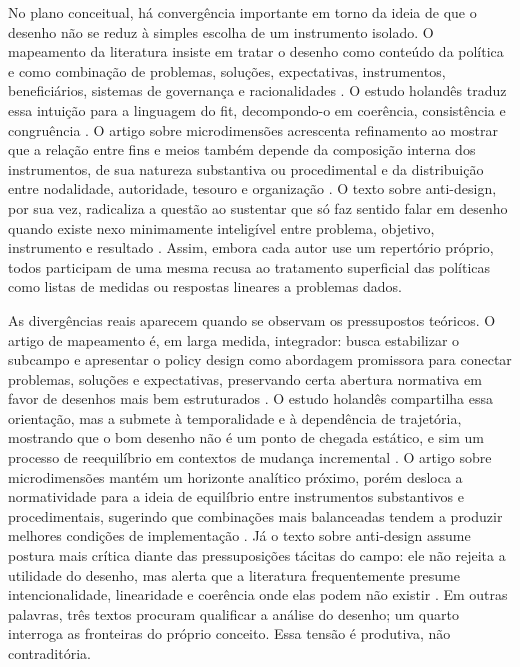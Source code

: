 \documentclass[12pt,a4paper]{article}
\begin{document}
No plano conceitual, há convergência importante em torno da ideia de que o desenho não se reduz à simples escolha de um instrumento isolado. O mapeamento da literatura insiste em tratar o desenho como conteúdo da política e como combinação de problemas, soluções, expectativas, instrumentos, beneficiários, sistemas de governança e racionalidades \parencite{lima2021_conectando_problemas}. O estudo holandês traduz essa intuição para a linguagem do fit, decompondo-o em coerência, consistência e congruência \parencite{geet2019_policy_design}. O artigo sobre microdimensões acrescenta refinamento ao mostrar que a relação entre fins e meios também depende da composição interna dos instrumentos, de sua natureza substantiva ou procedimental e da distribuição entre nodalidade, autoridade, tesouro e organização \parencite{lui2026_micro_dimensions}. O texto sobre anti-design, por sua vez, radicaliza a questão ao sustentar que só faz sentido falar em desenho quando existe nexo minimamente inteligível entre problema, objetivo, instrumento e resultado \parencite{newman2020_policy_design}. Assim, embora cada autor use um repertório próprio, todos participam de uma mesma recusa ao tratamento superficial das políticas como listas de medidas ou respostas lineares a problemas dados.

As divergências reais aparecem quando se observam os pressupostos teóricos. O artigo de mapeamento é, em larga medida, integrador: busca estabilizar o subcampo e apresentar o policy design como abordagem promissora para conectar problemas, soluções e expectativas, preservando certa abertura normativa em favor de desenhos mais bem estruturados \parencite{lima2021_conectando_problemas}. O estudo holandês compartilha essa orientação, mas a submete à temporalidade e à dependência de trajetória, mostrando que o bom desenho não é um ponto de chegada estático, e sim um processo de reequilíbrio em contextos de mudança incremental \parencite{geet2019_policy_design}. O artigo sobre microdimensões mantém um horizonte analítico próximo, porém desloca a normatividade para a ideia de equilíbrio entre instrumentos substantivos e procedimentais, sugerindo que combinações mais balanceadas tendem a produzir melhores condições de implementação \parencite{lui2026_micro_dimensions}. Já o texto sobre anti-design assume postura mais crítica diante das pressuposições tácitas do campo: ele não rejeita a utilidade do desenho, mas alerta que a literatura frequentemente presume intencionalidade, linearidade e coerência onde elas podem não existir \parencite{newman2020_policy_design}. Em outras palavras, três textos procuram qualificar a análise do desenho; um quarto interroga as fronteiras do próprio conceito. Essa tensão é produtiva, não contraditória.
\end{document}
